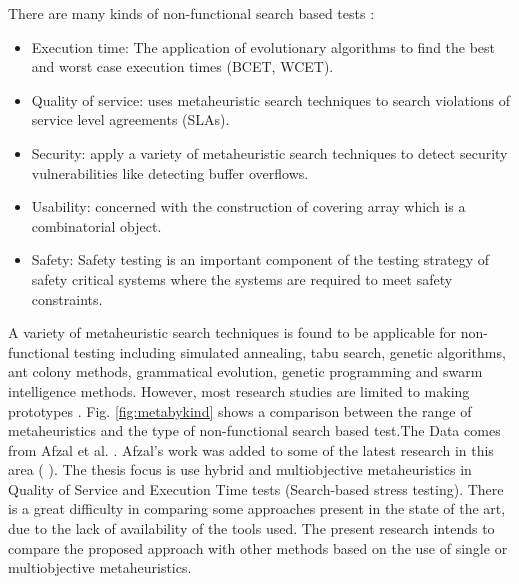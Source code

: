 \documentclass[espaco=umemeio,chapter=TITLE,twoside,openright]{abnt}
\begin{document}
There are many kinds of non-functional search based tests  \cite{Afzal2009a}:

\begin{itemize}
\item Execution time: The application of evolutionary algorithms to find the best and worst case execution times (BCET, WCET).
\item Quality of service: uses metaheuristic search techniques to search violations of service level agreements (SLAs).
\item Security: apply a variety of metaheuristic search techniques to detect security vulnerabilities like detecting buffer overflows.
\item Usability: concerned with the construction of covering array which is a combinatorial object.
\item Safety: Safety testing is an important component of the testing strategy of safety critical systems where the systems are required to meet safety constraints.
\end{itemize}

A variety of metaheuristic search techniques is found to be applicable for non-functional testing including simulated annealing, tabu search, genetic algorithms, ant colony methods, grammatical evolution, genetic programming and swarm intelligence methods. However, most research studies are limited to making prototypes \cite{Afzal2009a}.  Fig. \ref{fig:metabykind} shows a comparison between the range of metaheuristics and the type of non-functional search based test.The Data comes from Afzal et al. \cite{Afzal2009a}. Afzal's work was added to some of the latest research in this area (\cite{Garousi2006} \cite{Garousi2010} \cite{DiAlesio2013} \cite{DiAlesio2014} \cite{Alesio2015} \cite{Gois2016}). The thesis focus is use  hybrid and multiobjective metaheuristics in Quality of Service and Execution Time tests (Search-based stress testing). There is a great difficulty in
comparing some approaches present in the state of
the art, due to the lack of availability of the tools used. The present research intends to compare the proposed approach with other methods based on the use of single or multiobjective metaheuristics. 
\end{document}
